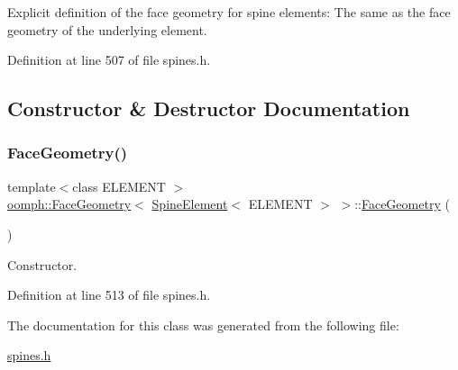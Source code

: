 Explicit definition of the face geometry for spine elements\+: The same as the face geometry of the underlying element. 

Definition at line 507 of file spines.\+h.



\subsection{Constructor \& Destructor Documentation}
\mbox{\label{classoomph_1_1FaceGeometry_3_01SpineElement_3_01ELEMENT_01_4_01_4_afe210062a83fdbdb5d729afc3460ef9d}} 
\subsubsection{\texorpdfstring{Face\+Geometry()}{FaceGeometry()}}
{\footnotesize\ttfamily template$<$class E\+L\+E\+M\+E\+NT $>$ \\
\hyperlink{classoomph_1_1FaceGeometry}{oomph\+::\+Face\+Geometry}$<$ \hyperlink{classoomph_1_1SpineElement}{Spine\+Element}$<$ E\+L\+E\+M\+E\+NT $>$ $>$\+::\hyperlink{classoomph_1_1FaceGeometry}{Face\+Geometry} (\begin{DoxyParamCaption}{ }\end{DoxyParamCaption})\hspace{0.3cm}{\ttfamily [inline]}}



Constructor. 



Definition at line 513 of file spines.\+h.



The documentation for this class was generated from the following file\+:\begin{DoxyCompactItemize}
\item 
\hyperlink{spines_8h}{spines.\+h}\end{DoxyCompactItemize}
